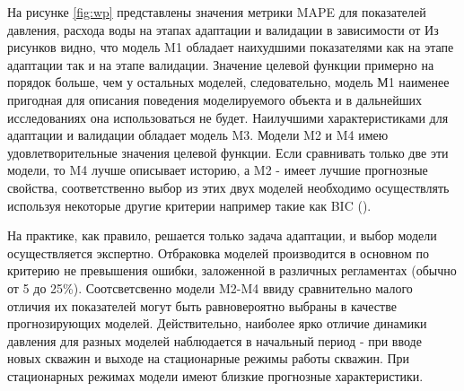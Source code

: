 \documentclass{article}
\begin{document}
На рисунке \ref{fig:wp} представлены значения метрики MAPE для показателей давления, расхода воды на этапах адаптации и валидации в зависимости от 
Из рисунков видно, что модель M1 обладает наихудшими показателями как на этапе адаптации так и на этапе валидации. Значение целевой функции примерно на порядок больше, чем у остальных моделей, следовательно, модель М1 наименее пригодная для описания поведения моделируемого объекта и в дальнейших исследованиях она использоваться не будет. Наилучшими характеристиками для адаптации и валидации обладает модель M3. Модели M2 и M4 имею удовлетворительные значения целевой функции. Если сравнивать только две эти модели, то M4 лучше описывает историю, а M2 - имеет лучшие прогнозные свойства, соответственно выбор из этих двух моделей необходимо осуществлять используя некоторые другие критерии например такие как BIC (\cite{mus}).

На практике, как правило, решается только задача адаптации, и выбор модели осуществляется экспертно. Отбраковка моделей производится в основном по критерию не превышения ошибки, заложенной в различных регламентах (обычно от 5 до 25\%). Соотсветсвенно модели M2-M4 ввиду сравнительно малого отличия их показателей могут быть равновероятно выбраны в качестве прогнозирующих моделей. Действительно, наиболее ярко отличие динамики давления для разных моделей наблюдается в начальный период - при вводе новых скважин и выходе на стационарные режимы работы скважин. При стационарных режимах модели имеют близкие прогнозные характеристики. 
\end{document}

